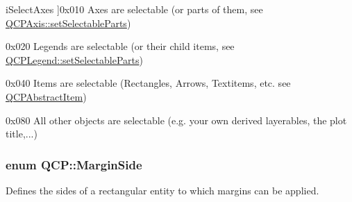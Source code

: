\begin{Desc}
\begin{description}
{i\+Select\+Axes\hypertarget{namespaceQCP_a2ad6bb6281c7c2d593d4277b44c2b037ad6644ac55bef621645326e9dd7469caa}{}\label{namespaceQCP_a2ad6bb6281c7c2d593d4277b44c2b037ad6644ac55bef621645326e9dd7469caa}
}]{\ttfamily 0x010} Axes are selectable (or parts of them, see \hyperlink{classQCPAxis_a513f9b9e326c505d9bec54880031b085}{Q\+C\+P\+Axis\+::set\+Selectable\+Parts}) \item[{\em 
i\+Select\+Legend\hypertarget{namespaceQCP_a2ad6bb6281c7c2d593d4277b44c2b037a269c9af298e257d1108edec0432b5513}{}\label{namespaceQCP_a2ad6bb6281c7c2d593d4277b44c2b037a269c9af298e257d1108edec0432b5513}
}]{\ttfamily 0x020} Legends are selectable (or their child items, see \hyperlink{classQCPLegend_a9ce60aa8bbd89f62ae4fa83ac6c60110}{Q\+C\+P\+Legend\+::set\+Selectable\+Parts}) \item[{\em 
i\+Select\+Items\hypertarget{namespaceQCP_a2ad6bb6281c7c2d593d4277b44c2b037aea2f7c105d674e76d9b187b02ef29260}{}\label{namespaceQCP_a2ad6bb6281c7c2d593d4277b44c2b037aea2f7c105d674e76d9b187b02ef29260}
}]{\ttfamily 0x040} Items are selectable (Rectangles, Arrows, Textitems, etc. see \hyperlink{classQCPAbstractItem}{Q\+C\+P\+Abstract\+Item}) \item[{\em 
i\+Select\+Other\hypertarget{namespaceQCP_a2ad6bb6281c7c2d593d4277b44c2b037af67a50bc26147a13b551b3a625374949}{}\label{namespaceQCP_a2ad6bb6281c7c2d593d4277b44c2b037af67a50bc26147a13b551b3a625374949}
}]{\ttfamily 0x080} All other objects are selectable (e.\+g. your own derived layerables, the plot title,...) \end{description}
\end{Desc}
\subsubsection[{\texorpdfstring{Margin\+Side}{MarginSide}}]{\setlength{\rightskip}{0pt plus 5cm}enum {\bf Q\+C\+P\+::\+Margin\+Side}}\hypertarget{namespaceQCP_a7e487e3e2ccb62ab7771065bab7cae54}{}\label{namespaceQCP_a7e487e3e2ccb62ab7771065bab7cae54}
Defines the sides of a rectangular entity to which margins can be applied.

